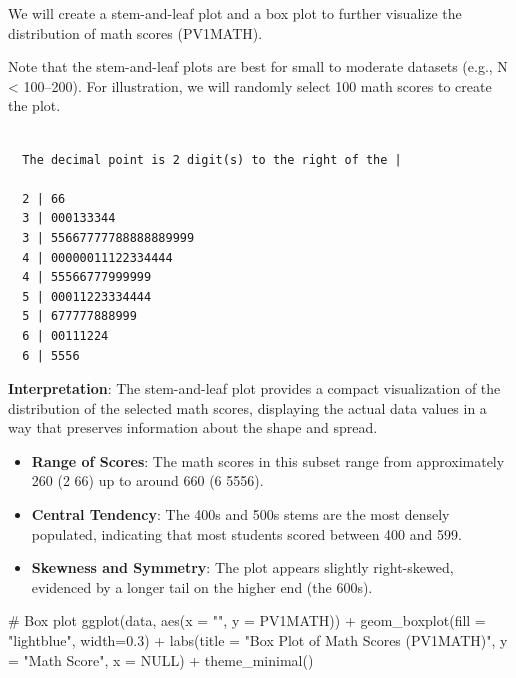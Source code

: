 \documentclass[
  letterpaper,
  DIV=11,
  numbers=noendperiod]{scrreprt}
\newenvironment{Shaded}{\begin{snugshade}}{\end{snugshade}}
\newcommand{\AttributeTok}[1]{\textcolor[rgb]{0.40,0.45,0.13}{#1}}
\newcommand{\CommentTok}[1]{\textcolor[rgb]{0.37,0.37,0.37}{#1}}
\newcommand{\ConstantTok}[1]{\textcolor[rgb]{0.56,0.35,0.01}{#1}}
\newcommand{\DecValTok}[1]{\textcolor[rgb]{0.68,0.00,0.00}{#1}}
\newcommand{\FloatTok}[1]{\textcolor[rgb]{0.68,0.00,0.00}{#1}}
\newcommand{\FunctionTok}[1]{\textcolor[rgb]{0.28,0.35,0.67}{#1}}
\newcommand{\NormalTok}[1]{\textcolor[rgb]{0.00,0.23,0.31}{#1}}
\newcommand{\OtherTok}[1]{\textcolor[rgb]{0.00,0.23,0.31}{#1}}
\newcommand{\SpecialCharTok}[1]{\textcolor[rgb]{0.37,0.37,0.37}{#1}}
\newcommand{\StringTok}[1]{\textcolor[rgb]{0.13,0.47,0.30}{#1}}
\begin{document}
We will create a stem-and-leaf plot and a box plot to further visualize
the distribution of math scores (PV1MATH).

Note that the stem-and-leaf plots are best for small to moderate
datasets (e.g., N \textless{} 100--200). For illustration, we will
randomly select 100 math scores to create the plot.

\begin{Shaded}
\end{Shaded}

\begin{verbatim}

  The decimal point is 2 digit(s) to the right of the |

  2 | 66
  3 | 000133344
  3 | 55667777788888889999
  4 | 00000011122334444
  4 | 55566777999999
  5 | 00011223334444
  5 | 677777888999
  6 | 00111224
  6 | 5556
\end{verbatim}

\textbf{Interpretation}: The stem-and-leaf plot provides a compact
visualization of the distribution of the selected math scores,
displaying the actual data values in a way that preserves information
about the shape and spread.

\begin{itemize}
\item
  \textbf{Range of Scores}: The math scores in this subset range from
  approximately 260 (2 \textbar{} 66) up to around 660 (6 \textbar{}
  5556).
\item
  \textbf{Central Tendency}: The 400s and 500s stems are the most
  densely populated, indicating that most students scored between 400
  and 599.
\item
  \textbf{Skewness and Symmetry}: The plot appears slightly
  right-skewed, evidenced by a longer tail on the higher end (the 600s).
\end{itemize}

\begin{Shaded}
\begin{Highlighting}[]
\CommentTok{\# Box plot }
\FunctionTok{ggplot}\NormalTok{(data, }\FunctionTok{aes}\NormalTok{(}\AttributeTok{x =} \StringTok{""}\NormalTok{, }\AttributeTok{y =}\NormalTok{ PV1MATH)) }\SpecialCharTok{+} 
  \FunctionTok{geom\_boxplot}\NormalTok{(}\AttributeTok{fill =} \StringTok{"lightblue"}\NormalTok{, }\AttributeTok{width=}\FloatTok{0.3}\NormalTok{) }\SpecialCharTok{+} 
  \FunctionTok{labs}\NormalTok{(}\AttributeTok{title =} \StringTok{"Box Plot of Math Scores (PV1MATH)"}\NormalTok{, }
       \AttributeTok{y =} \StringTok{"Math Score"}\NormalTok{, }\AttributeTok{x =} \ConstantTok{NULL}\NormalTok{) }\SpecialCharTok{+} 
  \FunctionTok{theme\_minimal}\NormalTok{() }
\end{Highlighting}
\end{Shaded}
\end{document}
